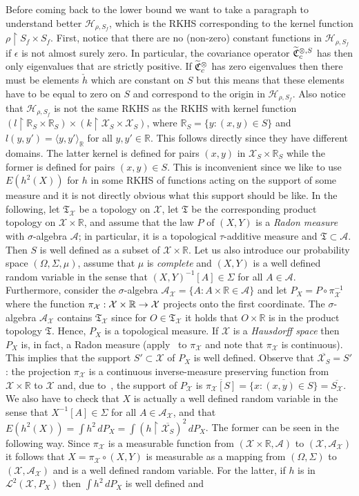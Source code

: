\documentclass[AHL,Unicode,longabstracts,published]{cedram}
\theoremstyle{remark}
\newcommand{\restrr}
{\!\!\upharpoonright\!\!}
\newcommand{\R}{\mathbb{R}}
\newcommand{\X}{\mathcal{X}}
\newcommand{\clA}{\mathcal{A}}
\newcommand{\cH}{\mathcal{H}}
\newcommand{\clL}{\mathcal{L}}
\newcommand{\fkC}{\mathfrak{C}}
\newcommand{\fkT}{\mathfrak{T}}
\newcommand{\Cov}{\tilde{\fkC}}
\let\oldtilde\tilde
\renewcommand*{\tilde}[1]{\mathchoice{\widetilde{#1}}{\widetilde{#1}}{\oldtilde{#1}}{\oldtilde{#1}}}
\renewcommand*{\to}{\mathchoice{\longrightarrow}{\rightarrow}{\rightarrow}{\rightarrow}}
\begin{document}
Before coming back to the lower bound we want to take a paragraph to understand better $\cH_{\rho,S_f}$, which is the RKHS corresponding to the kernel function $\rho\restrr S_f \times S_f$. First, notice that there are no (non-zero) constant functions in $\cH_{\rho,S_f}$ if $\epsilon$ is not almost surely zero. In particular, the covariance operator $\Cov_c^{\otimes,S}$ has then only eigenvalues that are strictly positive. If $\Cov_c^{\otimes}$ has zero eigenvalues then there must be elements $\check h$ which are constant on $S$ but this means that these elements have to be equal to zero on $S$ and correspond to the origin in $\cH_{\rho,S_f}$. Also notice that $\cH_{\rho,S_f}$ is not the same RKHS as the RKHS with kernel function $(l \restrr \R_S \times \R_S) \times (k \restrr \X_S \times \X_S)$, where $\R_S = \{y: (x,y) \in S\}$ and $l(y,y') = \langle y,y' \rangle_\R$ for all $y,y' \in \R$. This follows directly since they have different domains. The latter kernel is defined for pairs $(x,y)$ in $\X_S \times \R_S$ while the former is defined for pairs $(x,y) \in S$. This is inconvenient since we like to use $E(h^2(X))$ for $h$ in some RKHS of functions acting on the support of some measure and it is not directly obvious what this support should be like. In the following, let $\fkT_\X$ be a topology on $\X$, let $\fkT$ be the corresponding product topology on $\X \times \R$, and assume that the law $P$ of $(X,Y)$ is a \emph{Radon measure} with $\sigma$-algebra $\clA$; in particular, it is a topological $\tau$-additive measure and $\fkT \subset \clA$. Then $S$ is well defined as a subset of $\X \times \R$. Let us also introduce our probability space $(\Omega,\Sigma,\mu)$, assume that $\mu$ is \emph{complete} and $(X,Y)$ is a well defined random variable in the sense that $(X,Y)^{-1}[A] \in \Sigma$ for all $A \in \clA$. Furthermore, consider the $\sigma$-algebra $\clA_\X = \{A : A \times \R \in \clA\}$ and let $P_X = P \circ \pi_\X^{-1}$ where the function $\pi_\X: \X \times \R \to \X$ projects onto the first coordinate. The $\sigma$-algebra $\clA_\X$ contains $\fkT_\X$ since for $O \in \fkT_\X$ it holds that $O \times \R$ is in the product topology $\fkT$. Hence, $P_X$ is a topological measure. If $\X$ is a \emph{Hausdorff space} then $P_X$ is, in fact, a Radon measure (apply~\cite[418I]{FREM} to $\pi_\X$ and note that $\pi_\X$ is continuous). This implies that the support $S' \subset \X$ of $P_X$ is well defined. Observe that $\overline{\X_S} = S'$: the projection $\pi_\X$ is a continuous inverse-measure preserving function from $\X \times \R $ to $\X$ and, due to~\cite[411N.e]{FREM}, the support of $P_\X$ is $\overline{\pi_\X[S]} = \overline{ \{ x : (x,y) \in S\} } = \overline{S_\X}$. We also have to check that $X$ is actually a well defined random variable in the sense that $X^{-1}[A] \in \Sigma$ for all $A \in \clA_\X$, and that $E(h^2(X)) = \int h^2 \, dP_X = \int (h\!\restrr \overline{\X_S})^2 \, dP_X$. The former can be seen in the following way. Since $\pi_\X$ is a measurable function from $(\X \times \R, \clA)$ to $(\X, \clA_\X)$ it follows that $X = \pi_\X \circ (X,Y)$ is measurable as a mapping from $(\Omega,\Sigma)$ to $(\X,\clA_\X)$ and is a well defined random variable. For the latter, if $h$ is in $\clL^2(\X, P_X)$ then $\int h^2 \,dP_X$ is well defined and 
\end{document}
